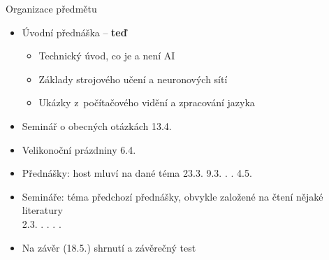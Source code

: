 \begin{frame}{Organizace předmětu}

    \begin{itemize}[<+->]

        \item Úvodní přednáška -- \textbf{teď}

        \begin{itemize}[<+->]

            \item Technický úvod, co je a není AI

            \item Základy strojového učení a neuronových sítí

            \item Ukázky z~počítačového vidění a zpracování jazyka

        \end{itemize}

		\item Seminář o obecných otázkách 13.4.

        \item Velikonoční prázdniny 6.4.

        \item Přednášky: host mluví na dané téma
            \hfill 23.3. \quad \phantom{0}9.3. . . \quad \phantom{0}4.5.

        \item Semináře: téma předchozí přednášky, obvykle založené na čtení
            nějaké literatury \\
            \hfill \phantom{0}2.3. . . . . 

        \item Na závěr (18.5.) shrnutí a závěrečný test

    \end{itemize}

    \vspace{5pt}

    \centering

\end{frame}

